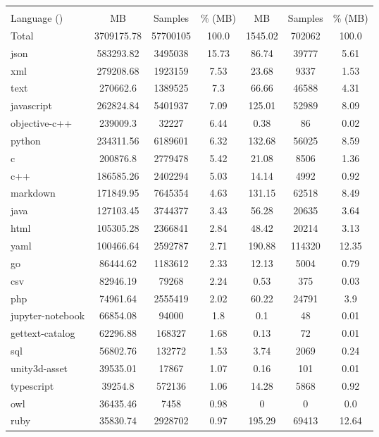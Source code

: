 \begin{longtable}{l|ccc|ccc}   
    \toprule
 & \multicolumn{3}{c|}{\data{}} & \multicolumn{3}{c}{\dataft{}} \\
Language () & MB & Samples & \% (MB) & MB & Samples & \% (MB) \\
\midrule
Total & 3709175.78 & 57700105 & 100.0 & 1545.02 & 702062 & 100.0 \\
\midrule
json & 583293.82 & 3495038 & 15.73 & 86.74 & 39777 & 5.61 \\
xml & 279208.68 & 1923159 & 7.53 & 23.68 & 9337 & 1.53 \\
text & 270662.6 & 1389525 & 7.3 & 66.66 & 46588 & 4.31 \\
javascript & 262824.84 & 5401937 & 7.09 & 125.01 & 52989 & 8.09 \\
objective-c++ & 239009.3 & 32227 & 6.44 & 0.38 & 86 & 0.02 \\
python & 234311.56 & 6189601 & 6.32 & 132.68 & 56025 & 8.59 \\
c & 200876.8 & 2779478 & 5.42 & 21.08 & 8506 & 1.36 \\
c++ & 186585.26 & 2402294 & 5.03 & 14.14 & 4992 & 0.92 \\
markdown & 171849.95 & 7645354 & 4.63 & 131.15 & 62518 & 8.49 \\
java & 127103.45 & 3744377 & 3.43 & 56.28 & 20635 & 3.64 \\
html & 105305.28 & 2366841 & 2.84 & 48.42 & 20214 & 3.13 \\
yaml & 100466.64 & 2592787 & 2.71 & 190.88 & 114320 & 12.35 \\
go & 86444.62 & 1183612 & 2.33 & 12.13 & 5004 & 0.79 \\
csv & 82946.19 & 79268 & 2.24 & 0.53 & 375 & 0.03 \\
php & 74961.64 & 2555419 & 2.02 & 60.22 & 24791 & 3.9 \\
jupyter-notebook & 66854.08 & 94000 & 1.8 & 0.1 & 48 & 0.01 \\
gettext-catalog & 62296.88 & 168327 & 1.68 & 0.13 & 72 & 0.01 \\
sql & 56802.76 & 132772 & 1.53 & 3.74 & 2069 & 0.24 \\
unity3d-asset & 39535.01 & 17867 & 1.07 & 0.16 & 101 & 0.01 \\
typescript & 39254.8 & 572136 & 1.06 & 14.28 & 5868 & 0.92 \\
owl & 36435.46 & 7458 & 0.98 & 0 & 0 & 0.0 \\
ruby & 35830.74 & 2928702 & 0.97 & 195.29 & 69413 & 12.64 \\

\end{longtable}
